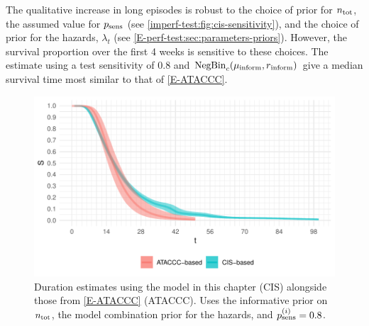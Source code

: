 \documentclass[thesis.tex]{subfiles}
\begin{document}
The qualitative increase in long episodes is robust to the choice of prior for $n_\text{tot}$, the assumed value for $p_\text{sens}$ (see \cref{imperf-test:fig:cis-sensitivity}), and the choice of prior for the hazards, $\lambda_t$ (see \cref{E-perf-test:sec:parameters-priors}).
However, the survival proportion over the first 4 weeks is sensitive to these choices.
The estimate using a test sensitivity of 0.8 and $\operatorname{NegBin}_{c}(\mu{_{\text{inform}}}, r{_{\text{inform}}})$ give a median survival time most similar to that of \cref{E-ATACCC}.
\begin{figure}
  \centering \includegraphics{cis-imperfect-testing/CIS_final}
  \caption{
    Duration estimates using the model in this chapter (CIS) alongside those from \cref{E-ATACCC} (ATACCC).
    Uses the informative prior on $n_\text{tot}$, the model combination prior for the hazards, and $p_\text{sens}^{(i)} = 0.8$.
  }
  \label{imperf-test:fig:cis-estimates}
\end{figure}
\end{document}

